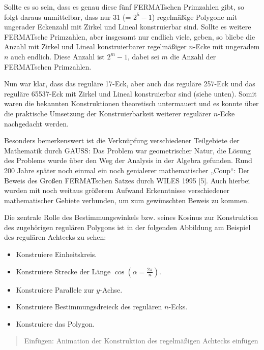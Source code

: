 \documentclass[11pt]{article}
\newcommand{\br}[1]{\ensuremath{\left(#1\right)}}
\newcommand{\HGG}[1]{\begin{quote} Einfügen: #1 \end{quote}}
\begin{document}
Sollte es so sein, dass es genau diese fünf FERMATschen Primzahlen gibt, so
folgt daraus unmittelbar, dass nur 31 (= $2^5 - 1$) regelmäßige Polygone mit
ungerader Eckenzahl mit Zirkel und Lineal konstruierbar sind. Sollte es
weitere FERMATsche Primzahlen, aber insgesamt nur endlich viele, geben, so
bliebe die Anzahl mit Zirkel und Lineal konstruierbarer regelmäßiger $n$-Ecke
mit ungeradem $n$ auch endlich. Diese Anzahl ist $2^m - 1$, dabei sei $m$ die
Anzahl der FERMATschen Primzahlen.

Nun war klar, dass das reguläre 17-Eck, aber auch das reguläre 257-Eck und das
reguläre 65537-Eck mit Zirkel und Lineal konstruierbar sind (siehe unten).
Somit waren die bekannten Konstruktionen theoretisch untermauert und es konnte
über die praktische Umsetzung der Konstruierbarkeit weiterer regulärer
$n$-Ecke nachgedacht werden.

Besonders bemerkenswert ist die Verknüpfung verschiedener Teilgebiete der
Mathematik durch GAUSS: Das Problem war geometrischer Natur, die Lösung des
Problems wurde über den Weg der Analysis in der Algebra gefunden. Rund 200
Jahre später noch einmal ein noch genialerer mathematischer „Coup“: Der Beweis
des Großen FERMATschen Satzes durch WILES 1995 [5]. Auch hierbei wurden mit
noch weitaus größerem Aufwand Erkenntnisse verschiedener mathematischer
Gebiete verbunden, um zum gewünschten Beweis zu kommen.

Die zentrale Rolle des Bestimmungswinkels bzw. seines Kosinus zur Konstruktion
des zugehörigen regulären Polygons ist in der folgenden Abbildung am Beispiel
des regulären Achtecks zu sehen: 
\begin{itemize}
\item Konstruiere Einheitskreis.
\item Konstruiere Strecke der Länge $\cos\br{\alpha=\frac{2\pi}{n}}$.
\item Konstruiere Parallele zur $y$-Achse.
\item Konstruiere Bestimmungsdreieck des regulären $n$-Ecks.
\item Konstruiere das Polygon.
\end{itemize}

\HGG{Animation der Konstruktion des regelmäßigen Achtecks einfügen}
\end{document}
